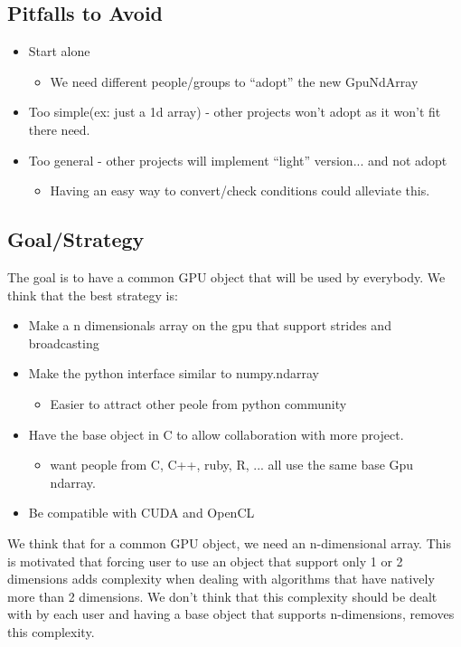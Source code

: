 \documentclass{article} %
\begin{document}
\subsection{Pitfalls to Avoid}
\begin{itemize}
\item Start alone
  \begin{itemize}
  \item We need different people/groups to ``adopt'' the new GpuNdArray
  \end{itemize}
\item Too simple(ex: just a 1d array) - other projects won't adopt as it won't fit there need.
\item Too general - other projects will implement ``light'' version... and not adopt
  \begin{itemize}
  \item Having an easy way to convert/check conditions could alleviate this.
  \end{itemize}
\end{itemize}

\subsection{Goal/Strategy}
The goal is to have a common GPU object that will be used by everybody. We think that the best strategy is:

\begin{itemize}
\item Make a n dimensionals array on the gpu that support strides and broadcasting
\item Make the python interface similar to numpy.ndarray
  \begin{itemize}
  \item Easier to attract other peole from python community
  \end{itemize}
\item Have the base object in C to allow collaboration with more project.
  \begin{itemize}
  \item  want people from C, C++, ruby, R, ... all use the same base Gpu ndarray.
  \end{itemize}
\item Be compatible with CUDA and OpenCL
\end{itemize}


We think that for a common GPU object, we need an n-dimensional
array. This is motivated that forcing user to use an object that
support only 1 or 2 dimensions adds complexity when dealing with algorithms that have natively more than 2 dimensions.
We don't think that this complexity should be dealt with by each user and 
having a base object that supports n-dimensions, removes
this complexity.
\end{document}

